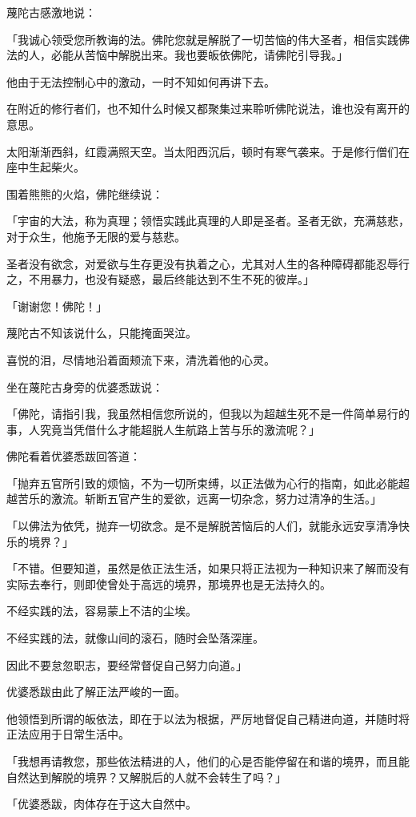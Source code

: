 \documentclass[twoside,openany]{book}
\begin{document}
蔑陀古感激地说：

「我诚心领受您所教诲的法。佛陀您就是解脱了一切苦恼的伟大圣者，相信实践佛法的人，必能从苦恼中解脱出来。我也要皈依佛陀，请佛陀引导我。」

他由于无法控制心中的激动，一时不知如何再讲下去。

在附近的修行者们，也不知什么时候又都聚集过来聆听佛陀说法，谁也没有离开的意思。

太阳渐渐西斜，红霞满照天空。当太阳西沉后，顿时有寒气袭来。于是修行僧们在座中生起柴火。

围着熊熊的火焰，佛陀继续说：

「宇宙的大法，称为真理；领悟实践此真理的人即是圣者。圣者无欲，充满慈悲，对于众生，他施予无限的爱与慈悲。

圣者没有欲念，对爱欲与生存更没有执着之心，尤其对人生的各种障碍都能忍辱行之，不用暴力，也没有疑惑，最后终能达到不生不死的彼岸。」

「谢谢您！佛陀！」

蔑陀古不知该说什么，只能掩面哭泣。

喜悦的泪，尽情地沿着面颊流下来，清洗着他的心灵。

坐在蔑陀古身旁的优婆悉跋说：

「佛陀，请指引我，我虽然相信您所说的，但我以为超越生死不是一件简单易行的事，人究竟当凭借什么才能超脱人生航路上苦与乐的激流呢？」

佛陀看着优婆悉跋回答道：

「抛弃五官所引致的烦恼，不为一切所束缚，以正法做为心行的指南，如此必能超越苦乐的激流。斩断五官产生的爱欲，远离一切杂念，努力过清净的生活。」

「以佛法为依凭，抛弃一切欲念。是不是解脱苦恼后的人们，就能永远安享清净快乐的境界？」

「不错。但要知道，虽然是依正法生活，如果只将正法视为一种知识来了解而没有实际去奉行，则即使曾处于高远的境界，那境界也是无法持久的。

不经实践的法，容易蒙上不洁的尘埃。

不经实践的法，就像山间的滚石，随时会坠落深崖。

因此不要怠忽职志，要经常督促自己努力向道。」

优婆悉跋由此了解正法严峻的一面。

他领悟到所谓的皈依法，即在于以法为根据，严厉地督促自己精进向道，并随时将正法应用于日常生活中。

「我想再请教您，那些依法精进的人，他们的心是否能停留在和谐的境界，而且能自然达到解脱的境界？又解脱后的人就不会转生了吗？」

「优婆悉跋，肉体存在于这大自然中。
\end{document}

